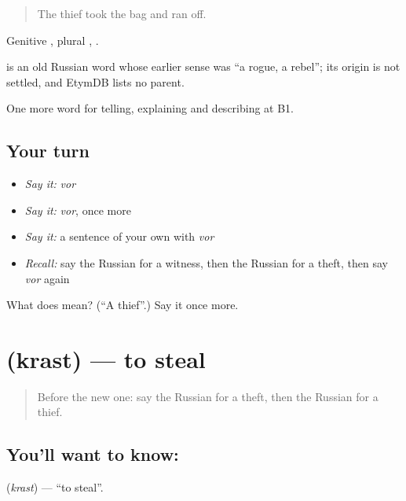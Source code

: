 \begin{quote}
The thief took the bag and ran off.
\end{quote}

Genitive \emph{}, plural \emph{}, \emph{}.

\begin{cousinweb}
\emph{} is an old Russian word whose earlier sense was \textquotedblleft{}a rogue, a rebel\textquotedblright{}; its origin is not settled, and EtymDB lists no parent.
\end{cousinweb}

\begin{grammarlens}[title={What you've built}]
One more word for telling, explaining and describing at B1.
\end{grammarlens}

\subsection*{Your turn}
\begin{itemize}
\raggedright
  \item \emph{Say it:} \emph{vor}
  \item \emph{Say it:} \emph{vor}, once more
  \item \emph{Say it:} a sentence of your own with \emph{vor}
  \item \emph{Recall:} say the Russian for a witness, then the Russian for a theft, then say \emph{vor} again
\end{itemize}

\begin{tcolorbox}[breakable,colback=teal!4,colframe=teal!35!black,title={Before you move on}]
What does  mean? (\textquotedblleft{}A thief\textquotedblright{}.) Say it once more.
\end{tcolorbox}
\section[\texorpdfstring{\ru{красть} (krast)}{красть (krast)}]{ (krast) — to steal}

\label{lesson:RU-C288-krast}



\begin{quote}
Before the new one: say the Russian for a theft, then the Russian for a thief.
\end{quote}

\subsection*{You'll want to know: }
\textbf{} (\emph{krast}) — \textquotedblleft{}to steal\textquotedblright{}.

